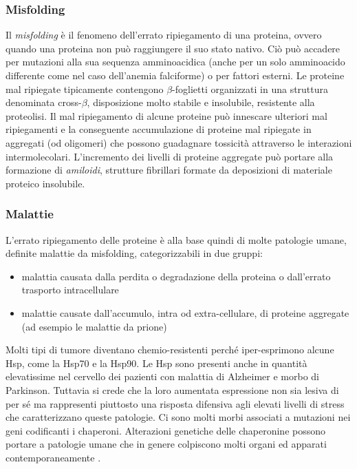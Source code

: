 {{\subsubsection{Misfolding}
Il \textit{misfolding} è il fenomeno dell'errato ripiegamento di una proteina, ovvero quando una proteina non può raggiungere il suo stato nativo. Ciò può accadere per mutazioni alla sua sequenza amminoacidica (anche per un solo amminoacido differente come nel caso dell'anemia falciforme) o per fattori esterni. Le proteine mal ripiegate tipicamente contengono $\beta$-foglietti organizzati in una struttura denominata cross-$\beta$, disposizione molto stabile e insolubile, resistente alla proteolisi. Il mal ripiegamento di alcune proteine può innescare ulteriori mal ripiegamenti e la conseguente accumulazione di proteine mal ripiegate in aggregati (od oligomeri) che possono guadagnare tossicità attraverso le interazioni intermolecolari. L'incremento dei livelli di proteine aggregate può portare alla formazione di \textit{amiloidi}, strutture fibrillari formate da deposizioni di materiale proteico insolubile. 

\subsubsection{Malattie}
L'errato ripiegamento delle proteine è alla base quindi di molte patologie umane, definite malattie da misfolding, categorizzabili in due gruppi:

\begin{itemize}
	\item malattia causata dalla perdita o degradazione della proteina o dall'errato trasporto intracellulare
	\item malattie causate dall'accumulo, intra od extra-cellulare, di proteine aggregate (ad esempio le malattie da prione)
\end{itemize}

Molti tipi di tumore diventano chemio-resistenti perché iper-esprimono alcune Hsp, come la Hsp70 e la Hsp90. Le Hsp sono presenti anche in quantità elevatissime nel cervello dei pazienti con malattia di Alzheimer e morbo di Parkinson. Tuttavia si crede che la loro aumentata espressione non sia lesiva di per sé ma rappresenti piuttosto una risposta difensiva agli elevati livelli di stress che caratterizzano queste patologie. Ci sono molti morbi associati a mutazioni nei geni codificanti i chaperoni. Alterazioni genetiche delle chaperonine possono portare a patologie umane che in genere colpiscono molti organi ed apparati contemporaneamente \supercite{chaperoninaWiki}. \\


}}
